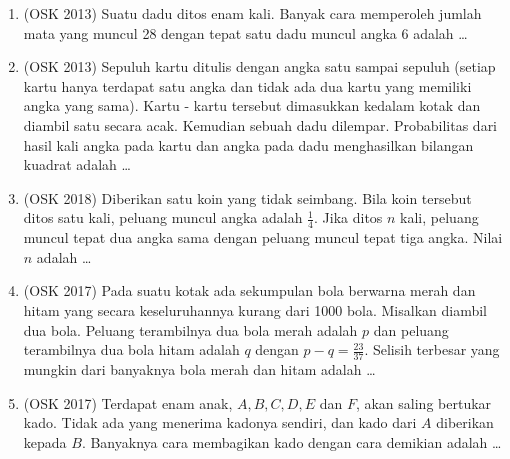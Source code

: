 \documentclass[11pt]{scrartcl}
\begin{document}
\begin{enumerate}
            \item (OSK 2013) Suatu dadu ditos enam kali. Banyak cara memperoleh jumlah mata yang muncul 28 dengan tepat satu dadu muncul angka 6 adalah \dots
            
            \item (OSK 2013) Sepuluh kartu ditulis dengan angka satu sampai sepuluh (setiap kartu hanya terdapat satu angka dan tidak ada dua kartu yang memiliki angka yang sama). Kartu - kartu tersebut dimasukkan kedalam kotak dan diambil satu secara acak. Kemudian sebuah dadu dilempar. Probabilitas dari hasil kali angka pada kartu dan angka pada dadu menghasilkan bilangan kuadrat adalah \dots
            
            \item (OSK 2018) Diberikan satu koin yang tidak seimbang. Bila koin tersebut ditos satu kali, peluang muncul angka adalah $\frac{1}{4}$. Jika ditos $n$ kali, peluang muncul tepat dua angka sama dengan peluang muncul tepat tiga angka. Nilai $n$ adalah \dots
            
            \item (OSK 2017) Pada suatu kotak ada sekumpulan bola berwarna merah dan hitam yang secara keseluruhannya kurang dari 1000 bola. Misalkan diambil dua bola. Peluang terambilnya dua bola merah adalah $p$ dan peluang terambilnya dua bola hitam adalah $q$ dengan $p-q =\frac{23}{37}$. Selisih terbesar yang mungkin dari banyaknya bola merah dan hitam adalah \dots
            
            \item (OSK 2017) Terdapat enam anak, $A, B, C, D, E$ dan $F$, akan saling bertukar kado. Tidak ada yang menerima kadonya sendiri, dan kado dari $A$ diberikan kepada $B$. Banyaknya cara membagikan kado dengan cara demikian adalah \dots
\end{enumerate}
\end{document}
